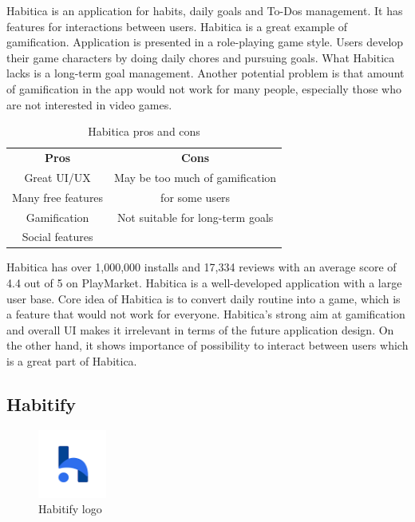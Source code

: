 Habitica is an application for habits, daily goals and To-Dos management.
It has features for interactions between users.
Habitica is a great example of gamification.
Application is presented in a role-playing game style.
Users develop their game characters by doing daily chores and pursuing goals.
What Habitica lacks is a long-term goal management.
Another potential problem is that amount of gamification in the app would not work for many people,
especially those who are not interested in video games.

\begin{table}[h!]
    \centering
    \begin{ctucolortab}
        \begin{tabular}{cc}
            \bfseries Pros & \bfseries Cons\\\Midrule
            Great UI/UX & May be too much of gamification \\
            Many free features & for some users \\
            Gamification & Not suitable for long-term goals \\
            Social features & \\
        \end{tabular}
    \end{ctucolortab}
    \caption{Habitica pros and cons}\label{tab:habitica-pros-cons}
\end{table}

Habitica has over 1,000,000 installs and 17,334 reviews with an average score of 4.4 out of 5 on PlayMarket.
Habitica is a well-developed application with a large user base.
Core idea of Habitica is to convert daily routine into a game, which is a feature that would not work for everyone.
Habitica's strong aim at gamification and overall UI makes it irrelevant in terms of the future application design.
On the other hand, it shows importance of possibility to interact between users which is a great part of Habitica.


\subsection{Habitify}\label{subsec:habitify}

\begin{figure}[h!]
    \includegraphics[width=0.20\textwidth]{images/habitify-logo.png}
    \caption{Habitify logo~\cite{habitify-logo}}
    \label{fig:habitify-logo}
\end{figure}


